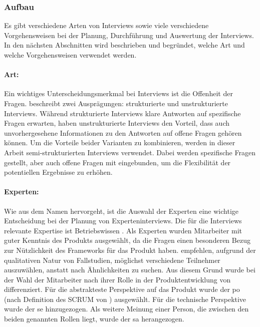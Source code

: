 \subsubsection{Aufbau}
Es gibt verschiedene Arten von Interviews sowie viele verschiedene Vorgehensweisen bei der Planung, Durchführung und Auswertung der Interviews.
In den nächsten Abschnitten wird beschrieben und begründet, welche Art und welche Vorgehensweisen verwendet werden.

\paragraph{Art:} Ein wichtiges Unterscheidungsmerkmal bei Interviews ist die Offenheit der Fragen.
 beschreibt zwei Ausprägungen: strukturierte und unstrukturierte Interviews.
Während struk\-tu\-rier\-te Interviews klare Antworten auf spezifische Fragen erwarten, haben unstrukturierte Interviews den Vorteil, dass auch unvorhergesehene Informationen zu den Antworten auf offene Fragen gehören können.
Um die Vorteile beider Varianten zu kombinieren, werden in dieser Arbeit semi-strukturierten Interviews \cite{seaman2008qualitative} verwendet.
Dabei werden spezifische Fragen gestellt, aber auch offene Fragen mit eingebunden, um die Flexibilität der potentiellen Ergebnisse zu erhöhen.

\paragraph{Experten:} Wie aus dem Namen hervorgeht, ist die Auswahl der Experten eine wichtige Entscheidung bei der Planung von Experteninterviews.
Die für die Interviews relevante Expertise ist \glqq Betriebswissen\grqq{} \cite{Meuser2009}.
Als Experten wurden Mitarbeiter mit guter Kenntnis des Produkts \jf ausgewählt, da die Fragen einen besonderen Bezug zur Nützlichkeit des Frameworks für das Produkt haben.
 empfehlen, aufgrund der qualitativen Natur von Fallstudien, möglichst verschiedene Teilnehmer auszuwählen, anstatt nach Ähnlichkeiten zu suchen.
Aus diesem Grund wurde bei der Wahl der Mitarbeiter nach ihrer Rolle in der Produktentwicklung von \jf differenziert.
Für die abstrakteste Perspektive auf das Produkt wurde der \acrlong{po} (nach Definition des SCRUM von ) ausgewählt.
Für die technische Perspektive wurde der \gls{se} hinzugezogen.
Als weitere Meinung einer Person, die zwischen den beiden genannten Rollen liegt, wurde der \gls{sa} herangezogen.

